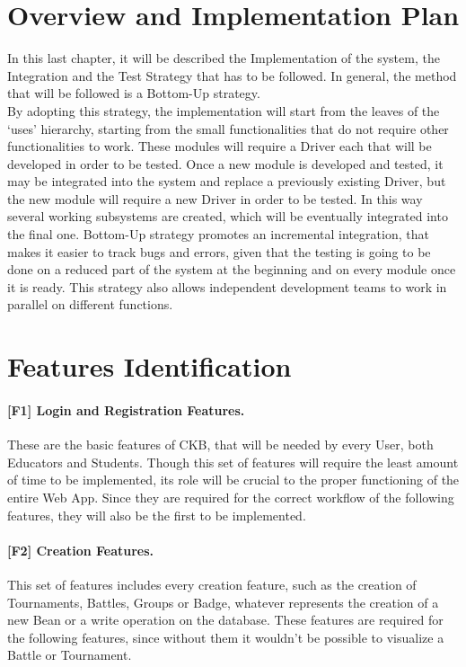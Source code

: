 \section{Overview and Implementation Plan}

In this last chapter, it will be described the Implementation of the system, the Integration and the Test Strategy that has to be followed. In general, the method that will be followed is a Bottom-Up strategy.\\
By adopting this strategy, the implementation will start from the leaves of the ‘uses’ hierarchy, starting from the small functionalities that do not require other functionalities to work. These modules will require a Driver each that will be developed in order to be tested. Once a new module is developed and tested, it may be integrated into the system and replace a previously existing Driver, but the new module will require a new Driver in order to be tested. In this way several working subsystems are created, which will be eventually integrated into the final one. Bottom-Up strategy promotes an incremental integration, that makes it easier to track bugs and errors, given that the testing is going to be done on a reduced part of the system at the beginning and on every module once it is ready. This strategy also allows independent development teams to work in parallel on different functions.


\section{Features Identification}

\paragraph{[F1] Login and Registration Features.} These are the basic features of CKB, that will be needed by every User, both Educators and Students. Though this set of features will require the least amount of time to be implemented, its role will be crucial to the proper functioning of the entire Web App. Since they are required for the correct workflow of the following features, they will also be the first to be implemented.

\paragraph{[F2] Creation Features.} This set of features includes every creation feature, such as the creation of Tournaments, Battles, Groups or Badge, whatever represents the creation of a new Bean or a write operation on the database. These features are required for the following features, since without them it wouldn’t be possible to visualize a Battle or Tournament.

